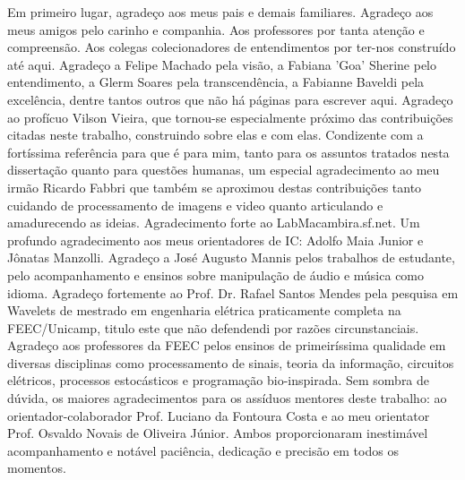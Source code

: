 Em primeiro lugar, agradeço aos meus pais e demais familiares. Agradeço aos
meus amigos pelo carinho e companhia. Aos professores por tanta atenção e compreensão.
Aos colegas colecionadores de entendimentos por ter-nos construído até aqui.
Agradeço a Felipe Machado pela visão, a Fabiana 'Goa' Sherine pelo entendimento,
a Glerm Soares pela transcendência, a Fabianne Baveldi pela excelência, dentre tantos outros que não há páginas para escrever aqui. Agradeço ao profícuo Vilson Vieira, que tornou-se especialmente próximo
das contribuições citadas neste trabalho, construindo sobre elas e com elas. Condizente com a fortíssima referência
para que é para mim, tanto para os assuntos tratados nesta dissertação quanto para questões humanas, um especial agradecimento
ao meu irmão Ricardo Fabbri que também se aproximou destas contribuições tanto cuidando de processamento de imagens e video quanto articulando e amadurecendo as ideias. Agradecimento
forte ao LabMacambira.sf.net. Um profundo agradecimento
aos meus orientadores de IC: Adolfo Maia Junior e Jônatas Manzolli. Agradeço a José Augusto Mannis
pelos trabalhos de estudante, pelo acompanhamento e ensinos sobre manipulação de áudio e música como idioma.
Agradeço fortemente ao Prof. Dr. Rafael Santos Mendes pela pesquisa em Wavelets de mestrado em engenharia elétrica
praticamente completa na FEEC/Unicamp, titulo este que não defendendi por razões circunstanciais. Agradeço aos professores da FEEC pelos ensinos de
primeiríssima qualidade em diversas disciplinas como processamento de sinais, teoria da informação, 
circuitos elétricos, processos estocásticos
e programação bio-inspirada. Sem sombra de dúvida, os maiores agradecimentos para os assíduos mentores
deste trabalho: ao orientador-colaborador Prof. Luciano da Fontoura Costa e ao meu 
orientator Prof. Osvaldo Novais de Oliveira Júnior. Ambos proporcionaram inestimável acompanhamento e notável paciência, dedicação e precisão em todos os momentos.
